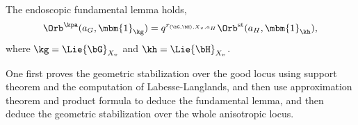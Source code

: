 \documentclass[article, a4paper, twoside]{universal}
\begin{document}
\begin{thm}
	The endoscopic fundamental lemma holds,
	\[
		\Orb^{\kpa}(a_{G},\mbm{1}_{\kg})=q^{r_{(\bG,\bH),X_{v},a_{H}}}\Orb^{\text{st}}(a_{H},\mbm{1}_{\kh}),
	\]
	where $\kg=\Lie{\bG}_{X_{v}}$ and $\kh=\Lie{\bH}_{X_{v}}$.
\end{thm}

\begin{rmk}
	One first proves the geometric stabilization over the good locus using support theorem and the computation of Labesse-Langlands, and then use approximation theorem and product formula to deduce the fundamental lemma, and then deduce the geometric stabilization over the whole anisotropic locus.
\end{rmk}



\printref
\end{document}
